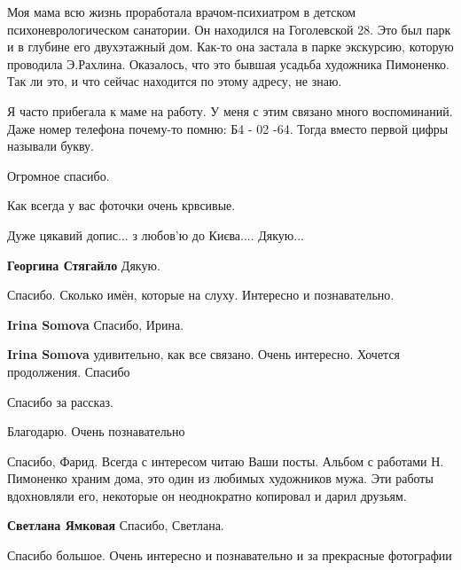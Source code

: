 \begin{itemize}

Моя мама всю жизнь проработала врачом-психиатром в детском психоневрологическом
санатории. Он находился на Гоголевской 28. Это был парк и в глубине его
двухэтажный дом. Как-то она застала в парке экскурсию, которую проводила
Э.Рахлина. Оказалось, что это бывшая усадьба художника Пимоненко. Так ли это, и
что сейчас находится по этому адресу, не знаю.

Я часто прибегала к маме на работу. У меня с этим связано много воспоминаний.
Даже номер телефона почему-то помню: Б4 - 02 -64. Тогда вместо первой цифры
называли букву.

\begin{itemize} %
Огромное спасибо.

Как всегда у вас фоточки очень крвсивые.
\end{itemize} %

Дуже цякавий допис... з любов'ю до Києва.... Дякую...

\begin{itemize} %
\textbf{Георгина Стягайло}
Дякую.
\end{itemize} %

Спасибо. Сколько имён, которые на слуху. Интересно и познавательно.

\begin{itemize} %
\textbf{Irina Somova}
Спасибо, Ирина.

\textbf{Irina Somova} удивительно, как все связано. Очень интересно. Хочется продолжения. Спасибо

\end{itemize} %

Спасибо за рассказ.

Благодарю. Очень познавательно


Спасибо, Фарид. Всегда с интересом читаю Ваши посты. Альбом с работами Н.
Пимоненко храним дома, это один из любимых художников мужа. Эти работы
вдохновляли его, некоторые он неоднократно копировал и дарил друзьям.

\textbf{Светлана Ямковая}
Спасибо, Светлана.

Спасибо большое. Очень интересно и познавательно и за прекрасные фотографии


\end{itemize}
